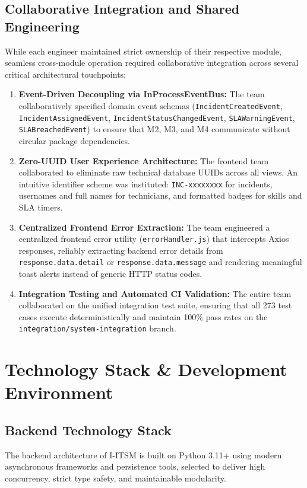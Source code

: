 \documentclass[11pt,a4paper,oneside]{report}
\begin{document}
\section{Collaborative Integration and Shared Engineering}
\label{sec:team_integration}
While each engineer maintained strict ownership of their respective module, seamless cross-module operation required collaborative integration across several critical architectural touchpoints:
\begin{enumerate}
    \item \textbf{Event-Driven Decoupling via InProcessEventBus:} The team collaboratively specified domain event schemas (\texttt{IncidentCreatedEvent}, \texttt{IncidentAssignedEvent}, \texttt{IncidentStatusChangedEvent}, \texttt{SLAWarningEvent}, \texttt{SLABreachedEvent}) to ensure that M2, M3, and M4 communicate without circular package dependencies.
    \item \textbf{Zero-UUID User Experience Architecture:} The frontend team collaborated to eliminate raw technical database UUIDs across all views. An intuitive identifier scheme was instituted: \texttt{INC-xxxxxxxx} for incidents, usernames and full names for technicians, and formatted badges for skills and SLA timers.
    \item \textbf{Centralized Frontend Error Extraction:} The team engineered a centralized frontend error utility (\texttt{errorHandler.js}) that intercepts Axios responses, reliably extracting backend error details from \texttt{response.data.detail} or \texttt{response.data.message} and rendering meaningful toast alerts instead of generic HTTP status codes.
    \item \textbf{Integration Testing and Automated CI Validation:} The entire team collaborated on the unified integration test suite, ensuring that all 273 test cases execute deterministically and maintain 100\% pass rates on the \texttt{integration/system-integration} branch.
\end{enumerate}


\chapter{Technology Stack \& Development Environment}
\label{ch:tech_stack}

\section{Backend Technology Stack}
\label{sec:tech_backend}
The backend architecture of I-ITSM is built on Python 3.11+ using modern asynchronous frameworks and persistence tools, selected to deliver high concurrency, strict type safety, and maintainable modularity.
\end{document}
